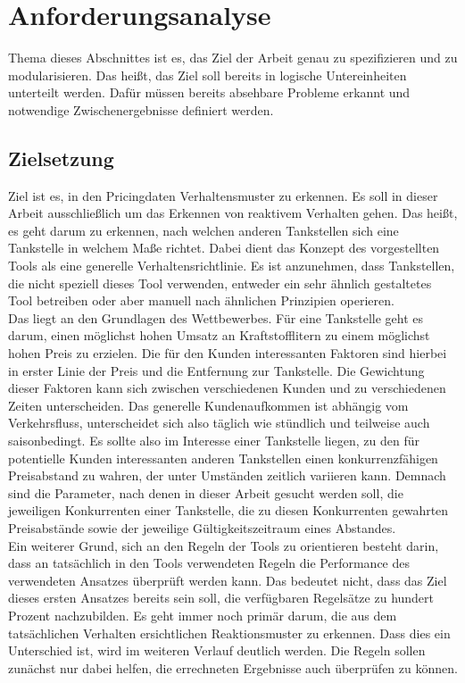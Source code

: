 \chapter{Anforderungsanalyse}
\label{sec:Anforderungsanalyse}

Thema dieses Abschnittes ist es, das Ziel der Arbeit genau zu spezifizieren und zu modularisieren. Das heißt, das Ziel soll bereits in logische Untereinheiten unterteilt werden. Dafür müssen bereits absehbare Probleme erkannt und notwendige Zwischenergebnisse definiert werden.

\section{Zielsetzung}
Ziel ist es, in den Pricingdaten Verhaltensmuster zu erkennen. Es soll in dieser Arbeit ausschließlich um das Erkennen von reaktivem Verhalten gehen. Das heißt, es geht darum zu erkennen, nach welchen anderen Tankstellen sich eine Tankstelle in welchem Maße richtet. Dabei dient das Konzept des vorgestellten Tools als eine generelle Verhaltensrichtlinie. Es ist anzunehmen, dass Tankstellen, die nicht speziell dieses Tool verwenden, entweder ein sehr ähnlich gestaltetes Tool betreiben oder aber manuell nach ähnlichen Prinzipien operieren.\\
Das liegt an den Grundlagen des Wettbewerbes. Für eine Tankstelle geht es darum, einen möglichst hohen Umsatz an Kraftstofflitern zu einem möglichst hohen Preis zu erzielen. Die für den Kunden interessanten Faktoren sind hierbei in erster Linie der Preis und die Entfernung zur Tankstelle. Die Gewichtung dieser Faktoren kann sich zwischen verschiedenen Kunden und zu verschiedenen Zeiten unterscheiden. Das generelle Kundenaufkommen ist abhängig vom Verkehrsfluss, unterscheidet sich also täglich wie stündlich und teilweise auch saisonbedingt. Es sollte also im Interesse einer Tankstelle liegen, zu den für potentielle Kunden interessanten anderen Tankstellen einen konkurrenzfähigen Preisabstand zu wahren, der unter Umständen zeitlich variieren kann. Demnach sind die Parameter, nach denen in dieser Arbeit gesucht werden soll, die jeweiligen Konkurrenten einer Tankstelle, die zu diesen Konkurrenten gewahrten Preisabstände sowie der jeweilige Gültigkeitszeitraum eines Abstandes.\\
Ein weiterer Grund, sich an den Regeln der Tools zu orientieren besteht darin, dass an tatsächlich in den Tools verwendeten Regeln die Performance des verwendeten Ansatzes überprüft werden kann. Das bedeutet nicht, dass das Ziel dieses ersten Ansatzes bereits sein soll, die verfügbaren Regelsätze zu hundert Prozent nachzubilden. Es geht immer noch primär darum, die aus dem tatsächlichen Verhalten ersichtlichen Reaktionsmuster zu erkennen. Dass dies ein Unterschied ist, wird im weiteren Verlauf deutlich werden. Die Regeln sollen zunächst nur dabei helfen, die errechneten Ergebnisse auch überprüfen zu können.

